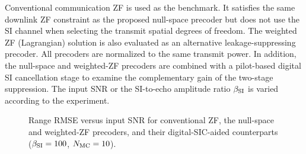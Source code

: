 
Conventional communication ZF is used as the benchmark. It satisfies the same
downlink ZF constraint as the proposed null-space precoder but does not use
the SI channel when selecting the transmit spatial degrees of freedom. The
weighted ZF (Lagrangian) solution is also evaluated as an alternative
leakage-suppressing precoder. All precoders are normalized to the same
transmit power. In addition, the null-space and weighted-ZF precoders are
combined with a pilot-based digital SI cancellation stage to examine the
complementary gain of the two-stage suppression. The input SNR or the
SI-to-echo amplitude ratio $\beta_{\rm SI}$ is varied according to the
experiment.

\begin{figure}[t]
    \centering
    \fbox{\rule{0.92\linewidth}{0.36\linewidth}}
    \caption{Range RMSE versus input SNR for conventional ZF, the null-space
    and weighted-ZF precoders, and their digital-SIC-aided counterparts
    ($\beta_{\rm SI}=100$, $N_{\rm MC}=10$).}
    \label{fig:snr_rmse}
\end{figure}

